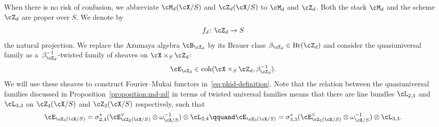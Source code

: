 \documentclass[11pt]{amsart}
\DeclareMathOperator{\coh}{\mathrm{coh}}
\DeclareMathOperator{\Br}{\mathrm{Br}}
\theoremstyle{plain}
\theoremstyle{definition}
\theoremstyle{remark}
\begin{document}
When there is no risk of confusion, we abbreviate $\cM_d(\cX/S)$ and $\cZ_d(\cX/S)$ to $\cM_d$ and $\cZ_d$.
Both the stack $\cM_d$ and the scheme $\cZ_d$ are proper over $S$.
We denote by
\begin{equation*}
f_d \colon \cZ_d \to S
\end{equation*}
the natural projection.
We replace the Azumaya algebra $\cB_{\cZ_d}$ by its Brauer class $\beta_{\cZ_d} \in \Br(\cZ_d)$ and 
consider the quasiuniversal family as a~$\beta^{-1}_{\cZ_d}$-twisted family of sheaves on $\cX \times_S \cZ_d$:
\begin{equation*}
\cE_{\cZ_d} \in \coh(\cX \times_S \cZ_d, \beta^{-1}_{\cZ_d}).
\end{equation*}
We will use these sheaves to construct Fourier--Mukai functors in~\eqref{eq:phid-definition}.
Note that the relation between the quasiuniversal families discussed in Proposition~\ref{proposition:md-zd} in terms of twisted universal families means that
there are line bundles $\cL_{2,4}$ and $\cL_{3,3}$ on $\cZ_4(\cX/S)$ and $\cZ_3(\cX/S)$ respectively, such that
\begin{equation*}
\cE_{\cZ_4(\cX/S)} = \sigma_{2,4}^*(\cE_{\cZ_2(\cX/S)}^{\vee} \otimes \omega_{\cX/S}^{-1}) \otimes \cL_{2,4}
\qquand
\cE_{\cZ_3(\cX/S)} = \sigma_{3,3}^*(\cE_{\cZ_3(\cX/S)}^{\vee} \otimes \omega_{\cX/S}^{-1}) \otimes \cL_{3,3}.
\end{equation*}



\end{document}
